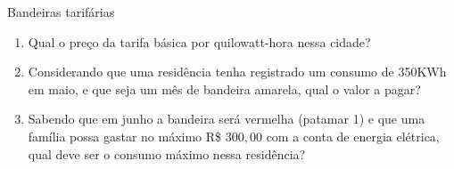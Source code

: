 \documentclass[extrafontsizes, twoside, 11pt, openright, final]{memoir}
\begin{document}
\begin{task}{Bandeiras tarifárias}
	\begin{enumerate}
		\item Qual o preço da tarifa básica por quilowatt-hora nessa cidade?
		\item Considerando que uma residência tenha registrado um consumo de 350KWh em maio, e que seja um mês de bandeira amarela, qual o valor a pagar?
		\item Sabendo que em junho a bandeira será vermelha (patamar 1) e que uma família possa gastar no máximo R\$ $300{,}00$ com a conta de energia elétrica, qual deve ser o consumo máximo nessa residência?
	\end{enumerate}

\end{task}


\know{}
\label{\detokenize{AF106-A::doc}}\label{\detokenize{AF106-A:para-saber-mais}}\label{\detokenize{AF106-A:sec-aprofundando-grafico}}
\end{document}
